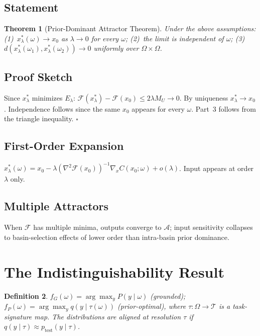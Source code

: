\documentclass[twocolumn,10pt]{article}
\theoremstyle{thmstyle}
\newtheorem{theorem}{Theorem}[section]
\theoremstyle{defstyle}
\newtheorem{definition}[theorem]{Definition}
\newcommand{\Fprior}{\mathcal{F}}
\newcommand{\Aset}{\mathcal{A}}
\begin{document}
\subsection{Statement}
\begin{theorem}[Prior-Dominant Attractor Theorem]
\label{thm:pdat}
Under the above assumptions: (1)~$x^*_\lambda(\omega)\to x_0$ as
$\lambda\to 0$ for every $\omega$; (2)~the limit is independent of
$\omega$; (3)~$d(x^*_\lambda(\omega_1),x^*_\lambda(\omega_2))\to 0$
uniformly over $\Omega\times\Omega$.
\end{theorem}

\subsection{Proof Sketch}
Since $x^*_\lambda$ minimizes $E_\lambda$:
$\Fprior(x^*_\lambda)-\Fprior(x_0)\leq 2\lambda M_U\to 0$.
By uniqueness $x^*_\lambda\to x_0$. Independence follows since the same
$x_0$ appears for every $\omega$. Part~3 follows from the triangle
inequality. \hfill$\square$

\subsection{First-Order Expansion}
$x^*_\lambda(\omega) = x_0 -
\lambda(\nabla^2\Fprior(x_0))^{-1}\nabla_x C(x_0;\omega) + o(\lambda)$.
Input appears at order $\lambda$ only.

\subsection{Multiple Attractors}
When $\Fprior$ has multiple minima, outputs converge to $\Aset$; input
sensitivity collapses to basin-selection effects of lower order than
intra-basin prior dominance.

\section{The Indistinguishability Result}
\label{app:indisc}

\begin{definition}
$f_G(\omega)=\arg\max_y P(y\mid\omega)$ (grounded);
$f_P(\omega)=\arg\max_y q(y\mid\tau(\omega))$ (prior-optimal), where
$\tau:\Omega\to\mathcal{T}$ is a task-signature map. The distributions
are \emph{aligned at resolution $\tau$} if $q(y\mid\tau)\approx
p_{\mathrm{test}}(y\mid\tau)$.
\end{definition}
\end{document}
